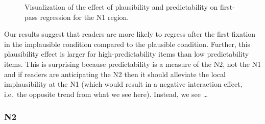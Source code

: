 \documentclass[
  letterpaper,
  DIV=11,
  numbers=noendperiod,
  nottoc,
  oneside]{scrreprt}
\begin{document}
\begin{figure}


\caption{\label{fig-firstpassn1}Visualization of the effect of
plausibility and predictability on first-pass regression for the N1
region.}

\end{figure}%

Our results suggest that readers are more likely to regress after the
first fixation in the implausible condition compared to the plausible
condition. Further, this plausibility effect is larger for
high-predictability items than low predictability items. This is
surprising because predictability is a measure of the N2, not the N1 and
if readers are anticipating the N2 then it should alleviate the local
implausibility at the N1 (which would result in a negative interaction
effect, i.e.~the opposite trend from what we see here). Instead, we see
\ldots{}

\subsubsection{N2}\label{n2-3}
\end{document}
